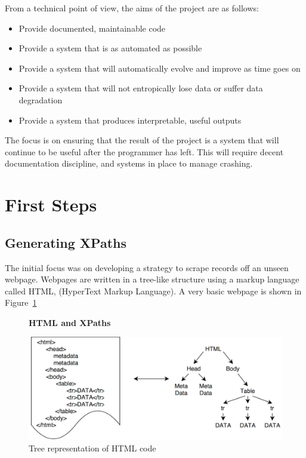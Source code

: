 \documentclass[11pt, oneside]{article}   	%
\begin{document}
From a technical point of view, the aims of the project are as follows:
\begin{itemize}
\item{Provide documented, maintainable code}
\item{Provide a system that is as automated as possible}
\item{Provide a system that will automatically evolve and improve as time goes on}
\item{Provide a system that will not entropically lose data or suffer data degradation}
\item{Provide a system that produces interpretable, useful outputs}
\end{itemize}
The focus is on ensuring that the result of the project is a system that will continue to be useful after the programmer has left. This will require decent documentation discipline, and systems in place to manage crashing.
\section{First Steps}
\subsection{Generating XPaths}
The initial focus was on developing a strategy to scrape records off an unseen webpage.
Webpages are written in a tree-like structure using a markup language called HTML, (HyperText Markup Language). A very basic webpage is shown in Figure~\ref{fig:HTMLTREE}
\begin{figure}
    \centering
    \textbf{HTML and XPaths}\par\medskip
    \includegraphics[scale=0.3]{HTMLTREE2.png}
    \caption{Tree representation of HTML code\label{fig:HTMLTREE}}
\end{figure}
\end{document}

